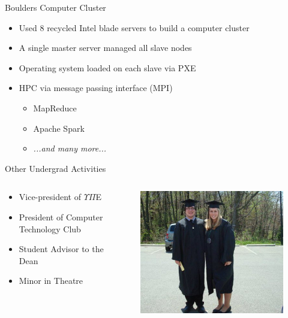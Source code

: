 \documentclass{beamer}
\begin{document}
\begin{frame}{Boulders Computer Cluster}
\begin{itemize}
	\item Used 8 recycled Intel blade servers to build a computer cluster
	\item A single master server managed all slave nodes
	\item Operating system loaded on each slave via PXE
	\item HPC via message passing interface (MPI)
	\begin{itemize}
		\item MapReduce
		\item Apache Spark
		\item \emph{...and many more...}
	\end{itemize}
\end{itemize}
\end{frame}

\begin{frame}{Other Undergrad Activities}
\begin{columns}
	\begin{column}{.50\textwidth}
		\begin{itemize}
			\item Vice-president of $\Upsilon\Pi$E
			\item President of Computer Technology Club
			\item Student Advisor to the Dean
			\item Minor in Theatre
		\end{itemize}
	\end{column}
	\begin{column}{.50\textwidth}
		\begin{figure}
			\includegraphics[width=\linewidth]{img/chrissie.jpg}
		\end{figure}
	\end{column}
\end{columns}
\end{frame}
\end{document}
